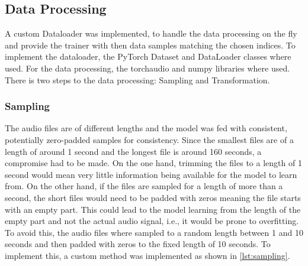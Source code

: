 \subsection{Data Processing}%
A custom Dataloader was implemented, to handle the data processing on the fly
and provide the trainer with then data samples matching the chosen indices.
To implement the dataloader, the PyTorch Dataset and DataLoader classes where used.
For the data processing, the torchaudio and numpy libraries where used.
There is two steps to the data processing: Sampling and Transformation.

\subsubsection{Sampling}%
The audio files are of different lengths and the model was fed with consistent, potentially zero-padded samples for consistency.
Since the smallest files are of a length of around 1 second and the longest file is around
160 seconds, a compromise had to be made. On the one hand, trimming the files to a length of 1 second
would mean very little information being available for the model to learn from. On the other
hand, if the files are sampled for a length of more than a second, the short files would need
to be padded with zeros meaning the file starts with an empty part. This could lead
to the model learning from the length of the empty part and not the actual audio signal, i.e., it would be prone to overfitting.
To avoid this, the audio files where sampled to a random length between 1 and 10 seconds and
then padded with zeros to the fixed length of 10 seconds. To implement this, a custom method
was implemented as shown in \autoref{lst:sampling}.




